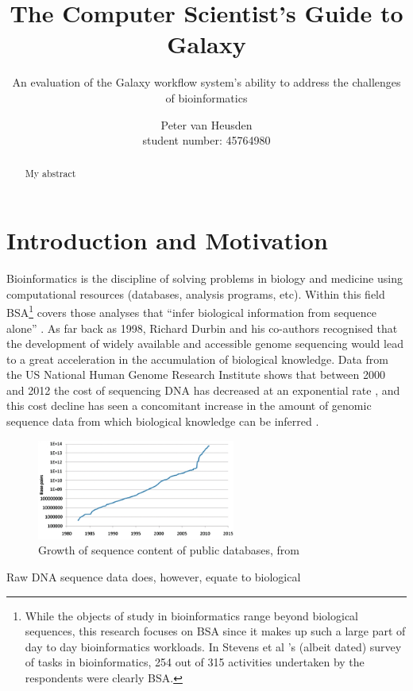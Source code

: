\documentclass[a4paper,10pt]{scrreprt} \usepackage[utf8]{inputenc}
\title{The Computer Scientist's Guide to Galaxy}
\subtitle{An evaluation of the Galaxy workflow system's ability to address the challenges of bioinformatics}
\author{Peter van Heusden\\
student number: 45764980}
\begin{document}


\maketitle

\begin{abstract}
My abstract
\end{abstract}

\tableofcontents

\listoffigures

\chapter{Introduction and Motivation}


Bioinformatics is the discipline of solving problems in biology and medicine using computational resources (databases, analysis programs, etc). Within this field \gls{BSA}\footnote{While the objects of study in bioinformatics range beyond biological sequences, this research focuses on \gls{BSA} since it makes up such a large part of day to day bioinformatics workloads. In Stevens et al \cite{stevens_classification_2001}'s (albeit dated) survey of tasks in bioinformatics, 254 out of 315 activities undertaken by the respondents were clearly \gls{BSA}.} covers those analyses that ``infer biological information from sequence alone'' \cite[p.~1]{durbin_biological_1998}. As far back as 1998, Richard Durbin and his co-authors recognised that the development of widely available and accessible genome sequencing would lead to a great acceleration in the accumulation of biological knowledge. Data from the US National Human Genome Research Institute shows that between 2000 and 2012 the cost of \gls{sequencing} \gls{DNA} has decreased at an exponential rate \cite{national_human_genome_research_institute_dna_2012}, and this cost decline has seen a concomitant increase in the amount of genomic sequence data from which biological knowledge can be inferred \cite{cochrane_international_2010}. \begin{figure}
  \vspace{-10pt}
  \centering
    \includegraphics[width=0.58\textwidth]{images/seqgrowth.png}
  \vspace{-10pt}
  \caption{Growth of sequence content of public databases, from \cite{cochrane_international_2010}}
  \vspace{-10pt}
\end{figure}Raw DNA sequence data does, however, equate to biological
\end{document}
